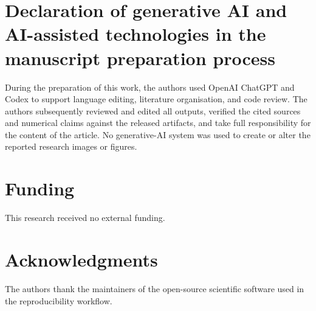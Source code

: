 \documentclass[preprint,12pt]{elsarticle}
\begin{document}
\section*{Declaration of generative AI and AI-assisted technologies in the manuscript preparation process}
During the preparation of this work, the authors used OpenAI ChatGPT and Codex to support language editing, literature organisation, and code review. The authors subsequently reviewed and edited all outputs, verified the cited sources and numerical claims against the released artifacts, and take full responsibility for the content of the article. No generative-AI system was used to create or alter the reported research images or figures.

\section*{Funding}
This research received no external funding.

\section*{Acknowledgments}
The authors thank the maintainers of the open-source scientific software used in the reproducibility workflow.



\end{document}
